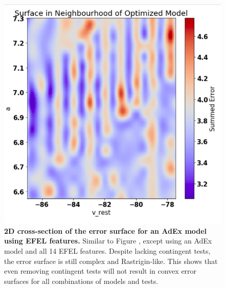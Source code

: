 \begin{figure}
    \centering
    \includegraphics[scale=0.75]{figures/corrogations.png}
        \caption[A Complicated Error Surface]{\textbf{2D cross-section of the error surface for an AdEx model using EFEL features.}
    Similar to Figure \label{fig:constant_current}, except using an AdEx model and all 14 EFEL features.
    Despite lacking contingent tests, the error surface is still complex and Rastrigin-like.
    This shows that even removing contingent tests will not result in convex error surfaces for all combinations of models and tests.}
    \label{fig:real_problem_nontrivial_surface-1}
\end{figure}


